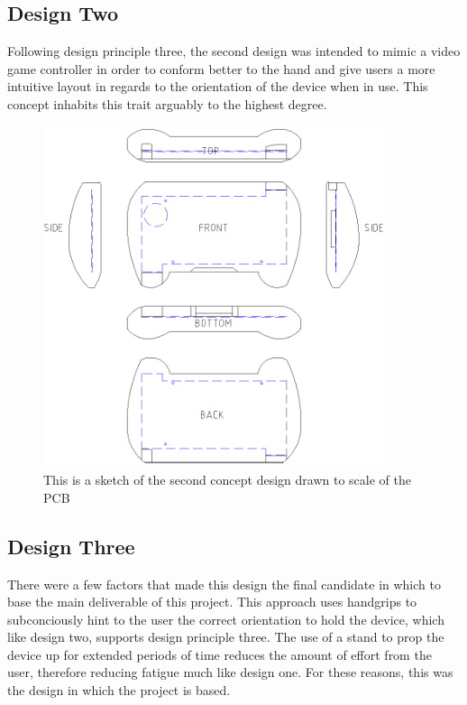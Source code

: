 \subsection{Design Two}

Following design principle three, the second design was intended to mimic a video game controller in order to conform better to the hand and give users a more intuitive layout in regards to the orientation of the device when in use. 
This concept inhabits this trait arguably to the highest degree.

\begin{figure}[hbt!]
\centering
\includegraphics[width=10cm,height=10cm,keepaspectratio]{Figures/design2_sketch.png}
\caption{This is a sketch of the second concept design drawn to scale of the PCB}
\label{fig:Design_2}
\end{figure}

\subsection{Design Three}

There were a few factors that made this design the final candidate in which to base the main deliverable of this project.
This approach uses handgrips to subconciously hint to the user the correct orientation to hold the device, which like design two, supports design principle three.
The use of a stand to prop the device up for extended periods of time reduces the amount of effort from the user, therefore reducing fatigue much like design one.
For these reasons, this was the design in which the project is based.

